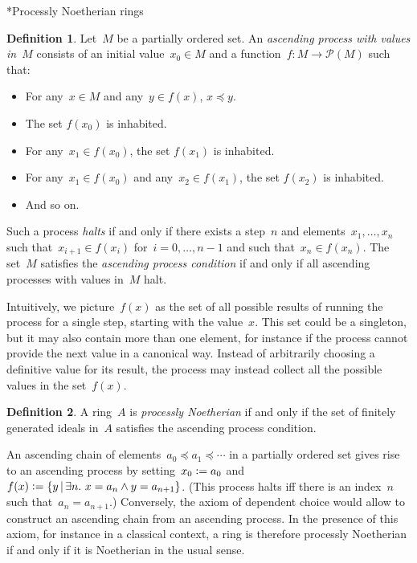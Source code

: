 \documentclass[10pt,reqno,a4paper]{amsbook}
\makeatletter
\theoremstyle{definition}
\newtheorem{defn}{Definition}[section]
\theoremstyle{plain}
\theoremstyle{remark}
\renewcommand{\P}{\mathcal{P}}
\newcommand{\?}{\,{:}\,}
\renewcommand{\_}{\mathpunct{.}\,}
\newcommand{\defeq}{\vcentcolon=}
\newcommand{\nocontentsline}[3]{}
\newcommand{\tocless}[1]{\let\addcontentsline=\nocontentsline}
\def\subsection{\@startsection{subsection}{2}%
  {0pt}{.5\linespacing\@plus.7\linespacing}{-.5em}%
  {\normalfont\bfseries}}
\makeatother
\begin{document}
{\tocless

\subsection*{Processly Noetherian rings}

\begin{defn}Let~$M$ be a partially ordered set. An \emph{ascending process
with values in~$M$} consists of an initial value~$x_0 \in M$ and a function~$f
: M \to \P(M)$ such that:
\begin{itemize}
\item For any~$x \in M$ and any~$y \in f(x)$, $x \preceq y$.
\item The set $f(x_0)$ is inhabited.
\item For any~$x_1 \in f(x_0)$, the set $f(x_1)$ is inhabited.
\item For any~$x_1 \in f(x_0)$ and any~$x_2 \in f(x_1)$, the set $f(x_2)$ is inhabited.
\item And so on.
\end{itemize}
Such a process \emph{halts} if and only if there
exists a step~$n$ and elements~$x_1, \ldots, x_n$ such that~$x_{i+1}
\in f(x_i)$ for~$i = 0,\ldots,n-1$ and such that~$x_n \in f(x_n)$.
The set~$M$ satisfies the \emph{ascending process condition} if and only if all
ascending processes with values in~$M$ halt.
\end{defn}

Intuitively, we picture~$f(x)$ as the set of all possible results of running
the process for a single step, starting with the value~$x$. This set could
be a singleton, but it may also contain more than one element, for instance if
the process cannot provide the next value in a canonical way. Instead of
arbitrarily choosing a definitive value for its result, the process may instead
collect all the possible values in the set~$f(x)$.

\begin{defn}A ring~$A$ is \emph{processly Noetherian} if and only if the
set of finitely generated ideals in~$A$ satisfies the ascending process
condition.\end{defn}

An ascending chain of elements~$a_0 \preceq a_1 \preceq \cdots$ in a partially
ordered set gives rise to an ascending process by setting~$x_0 \defeq a_0$
and~$f(x) \defeq \{ y \,|\, \exists n\_ x = a_n \wedge y = a_{n+1} \}$.
(This process halts iff there is an index~$n$ such that~$a_n = a_{n+1}$.)
Conversely, the axiom of dependent choice would allow to construct an
ascending chain from an ascending process. In the presence of this axiom, for
instance in a classical context, a ring is therefore
processly Noetherian if and only if it is Noetherian in the usual sense.

}
\end{document}

